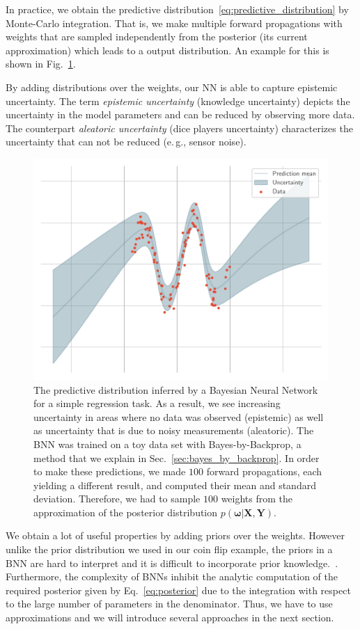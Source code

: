 \documentclass[runningheads]{llncs}
\begin{document}
In practice, we obtain the predictive distribution~\ref{eq:predictive_distribution} by Monte-Carlo integration.
That is, we make multiple forward propagations with weights that are sampled independently from the posterior (its current approximation) which leads to a output distribution. An example for this is shown in Fig.~\ref{fig:uncertainty_example}.

By adding distributions over the weights, our NN is able to capture epistemic uncertainty.
The term \textit{epistemic uncertainty} (knowledge uncertainty) depicts the uncertainty in the model parameters and can be reduced by observing more data. 
The counterpart \textit{aleatoric uncertainty} (dice players uncertainty) characterizes the uncertainty that can not be reduced (e.\,g., sensor noise). 
\begin{figure}
    \centering
    \includegraphics[width=.7\textwidth]{images/uncertainty_example.pdf}
    \caption{The predictive distribution inferred by a Bayesian Neural Network for a simple regression task. As a result, we see increasing uncertainty in areas where no data was observed (epistemic) as well as uncertainty that is due to noisy measurements (aleatoric). The BNN was trained on a toy data set with Bayes-by-Backprop, a method that we explain in Sec.~\ref{sec:bayes_by_backprop}.
    In order to make these predictions, we made $100$ forward propagations, each yielding a different result, and computed their mean and standard deviation. Therefore, we had to sample $100$ weights from the approximation of the posterior distribution $p(\boldsymbol{\omega}| \mathbf{X}, \mathbf{Y})$.}
    \label{fig:uncertainty_example}
\end{figure}

We obtain a lot of useful properties by adding priors over the weights.
However unlike the prior distribution we used in our coin flip example, the priors in a BNN are hard to interpret and it is difficult to incorporate prior knowledge.~\cite{Neal:1995:BLN:922680}.
Furthermore, the complexity of BNNs inhibit the analytic computation of the required posterior given by Eq.~\ref{eq:posterior} due to the integration with respect to the large number of parameters in the denominator.
Thus, we have to use approximations and we will introduce several approaches in the next section.
\end{document}
